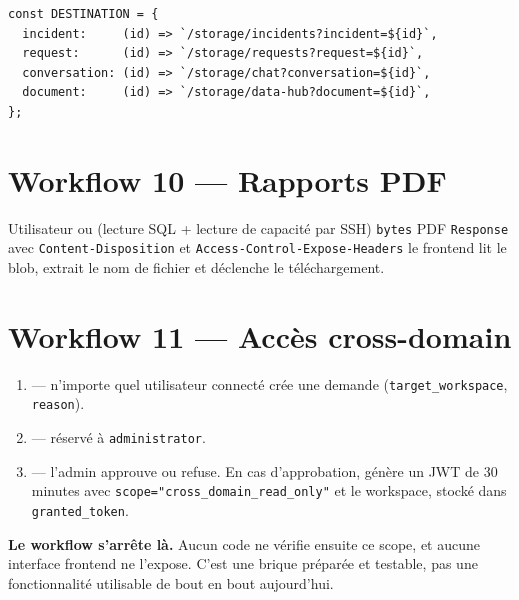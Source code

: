 \begin{lstlisting}[caption={frontend/src/components/layout/GlobalSearch.tsx}]
const DESTINATION = {
  incident:     (id) => `/storage/incidents?incident=${id}`,
  request:      (id) => `/storage/requests?request=${id}`,
  conversation: (id) => `/storage/chat?conversation=${id}`,
  document:     (id) => `/storage/data-hub?document=${id}`,
};
\end{lstlisting}

\section{Workflow 10 --- Rapports PDF}

Utilisateur \arrowto{}  \arrowto{}  \arrowto{}
 ou
 \arrowto{}
 (lecture SQL + lecture de capacité par SSH)
\arrowto{} \texttt{bytes} PDF \arrowto{} \texttt{Response} avec
\texttt{Content-Disposition} et \texttt{Access-Control-Expose-Headers}
\arrowto{} le frontend lit le blob, extrait le nom de fichier et déclenche le
téléchargement.

\section{Workflow 11 --- Accès cross-domain}

\begin{enumerate}
  \item {} --- n'importe quel utilisateur
  connecté crée une demande (\texttt{target\_workspace}, \texttt{reason}).
  \item {} --- réservé à
  \texttt{administrator}.
  \item {} --- l'admin approuve
  ou refuse. En cas d'approbation,  génère un
  JWT de 30 minutes avec \texttt{scope="cross\_domain\_read\_only"} et le
  workspace, stocké dans \texttt{granted\_token}.
\end{enumerate}

\begin{warnbox}
\textbf{Le workflow s'arrête là.} Aucun code ne vérifie ensuite ce scope, et
aucune interface frontend ne l'expose. C'est une brique préparée et testable,
pas une fonctionnalité utilisable de bout en bout aujourd'hui.
\end{warnbox}

